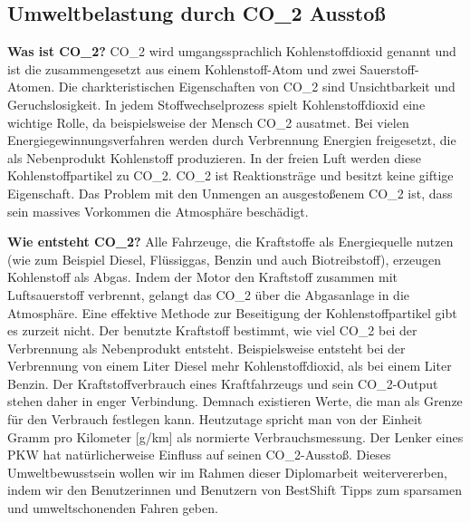 \subsection{Umweltbelastung durch CO_{2} Ausstoß}

\textbf{Was ist CO_{2}?}
CO_{2} wird umgangssprachlich Kohlenstoffdioxid genannt und ist die zusammengesetzt aus einem Kohlenstoff-Atom und zwei Sauerstoff-Atomen. 
Die charkteristischen Eigenschaften von CO_{2} sind Unsichtbarkeit und Geruchslosigkeit. 
In jedem Stoffwechselprozess spielt Kohlenstoffdioxid eine wichtige Rolle, da beispielsweise der Mensch CO_{2} ausatmet. 
Bei vielen Energiegewinnungsverfahren werden durch Verbrennung Energien freigesetzt, die als Nebenprodukt Kohlenstoff produzieren. 
In der freien Luft werden diese Kohlenstoffpartikel zu CO_{2}.
CO_{2} ist Reaktionsträge und besitzt keine giftige Eigenschaft. 
Das Problem mit den Unmengen an ausgestoßenem CO_{2} ist, dass sein massives Vorkommen die Atmosphäre beschädigt.

\textbf{Wie entsteht CO_{2}?}
Alle Fahrzeuge, die Kraftstoffe als Energiequelle nutzen 
(wie zum Beispiel Diesel, Flüssiggas, Benzin und auch Biotreibstoff), erzeugen Kohlenstoff als Abgas. 
Indem der Motor den Kraftstoff zusammen mit Luftsauerstoff verbrennt, gelangt das CO_{2} über die Abgasanlage in die Atmosphäre. 
Eine effektive Methode zur Beseitigung der Kohlenstoffpartikel gibt es zurzeit nicht. 
Der benutzte Kraftstoff bestimmt, wie viel CO_{2} bei der Verbrennung als Nebenprodukt entsteht.
Beispielsweise entsteht bei der Verbrennung von einem Liter Diesel mehr Kohlenstoffdioxid, als bei einem Liter Benzin.
Der Kraftstoffverbrauch eines Kraftfahrzeugs und sein CO_{2}-Output stehen daher in enger Verbindung.
Demnach existieren Werte, die man als Grenze für den Verbrauch festlegen kann. 
Heutzutage spricht man von der Einheit Gramm pro Kilometer [g/km] als normierte Verbrauchsmessung.
Der Lenker eines PKW hat natürlicherweise Einfluss auf seinen CO_{2}-Ausstoß. 
Dieses Umweltbewusstsein wollen wir im Rahmen dieser Diplomarbeit weitervererben, indem wir den Benutzerinnen und Benutzern 
von BestShift Tipps zum sparsamen und umweltschonenden Fahren geben.

